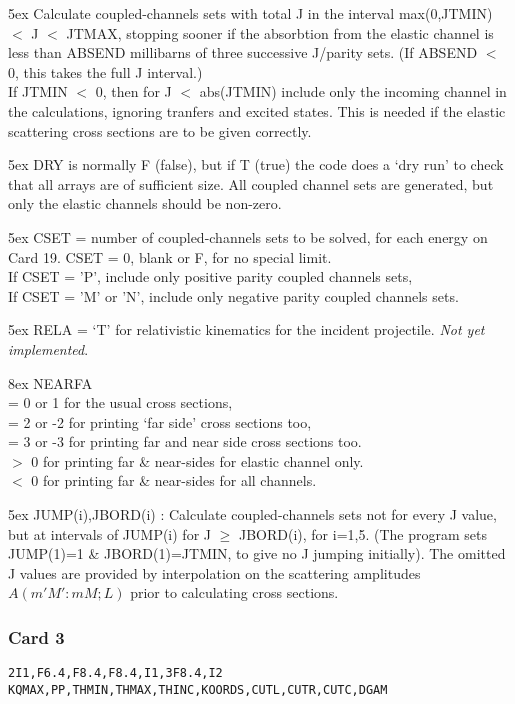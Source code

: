 \documentclass[11pt]{article}
\begin{document}
\hangindent 5ex
Calculate coupled-channels sets with total J in the interval
max(0,JTMIN) $<$  J  $<$ JTMAX,
stopping sooner if the absorbtion from the elastic channel
is less than ABSEND millibarns of three successive J/parity sets.
(If ABSEND $<$ 0, this takes the full J interval.)
\\
If JTMIN $<$ 0, then for J $<$ abs(JTMIN) include only the incoming channel
in the calculations, ignoring tranfers and excited states.
This is needed if the elastic scattering cross sections are to be given
correctly.

\hangindent 5ex
DRY is normally F (false), but if T (true) the code does a `dry run'
to check that all arrays are of sufficient size.
All coupled channel sets are generated, but only the elastic
channels should be non-zero.

\hangindent 5ex
CSET = number of coupled-channels sets to be solved, for each energy
on Card 19.  CSET = 0, blank or F, for no special limit.\\
If CSET = 'P', include only positive parity coupled channels sets,\\
If CSET = 'M' or 'N', include only negative parity coupled channels sets.

\hangindent 5ex
RELA = `T' for relativistic kinematics for the incident projectile.
{\em Not yet implemented}.

\hangindent 8ex  NEARFA
\\  = 0 or 1 for the usual cross sections,
\\  = 2 or -2 for printing `far side' cross sections too,
\\  = 3 or -3 for printing far and near side cross sections too.
\\  $>$ 0 for printing far \& near-sides for elastic channel only.
\\  $<$ 0 for printing far \& near-sides for all channels.



\hangindent 5ex
JUMP(i),JBORD(i) : Calculate coupled-channels sets not for every J
value, but at intervals of JUMP(i) for J $\geq$ JBORD(i), for i=1,5.
(The program sets JUMP(1)=1 \& JBORD(1)=JTMIN, to give no J jumping initially).
The omitted J values are provided by interpolation on the scattering
amplitudes $A(m'M':mM; L)$ prior to calculating cross sections.

\subsubsection*{Card 3}
\begin{verbatim}
2I1,F6.4,F8.4,F8.4,I1,3F8.4,I2  
KQMAX,PP,THMIN,THMAX,THINC,KOORDS,CUTL,CUTR,CUTC,DGAM
\end{verbatim}
\end{document}
